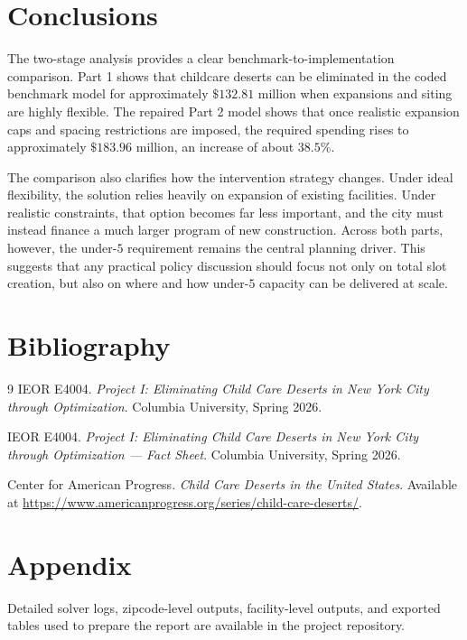 \documentclass[11pt]{article}
\newcommand{\1}{\mathbb{I}}
\begin{document}
\section*{Conclusions}

The two-stage analysis provides a clear benchmark-to-implementation comparison. Part 1 shows that childcare deserts can be eliminated in the coded benchmark model for approximately \(\$132.81\) million when expansions and siting are highly flexible. The repaired Part 2 model shows that once realistic expansion caps and spacing restrictions are imposed, the required spending rises to approximately \(\$183.96\) million, an increase of about \(38.5\%\).

The comparison also clarifies how the intervention strategy changes. Under ideal flexibility, the solution relies heavily on expansion of existing facilities. Under realistic constraints, that option becomes far less important, and the city must instead finance a much larger program of new construction. Across both parts, however, the under-\(5\) requirement remains the central planning driver. This suggests that any practical policy discussion should focus not only on total slot creation, but also on where and how under-\(5\) capacity can be delivered at scale.

\section*{Bibliography}

\begin{thebibliography}{9}
IEOR E4004. \emph{Project I: Eliminating Child Care Deserts in New York City through Optimization}. Columbia University, Spring 2026.

IEOR E4004. \emph{Project I: Eliminating Child Care Deserts in New York City through Optimization --- Fact Sheet}. Columbia University, Spring 2026.

Center for American Progress. \emph{Child Care Deserts in the United States}. Available at \url{https://www.americanprogress.org/series/child-care-deserts/}.
\end{thebibliography}

\appendix

\section*{Appendix}

Detailed solver logs, zipcode-level outputs, facility-level outputs, and exported tables used to prepare the report are available in the project repository.

\end{document}
